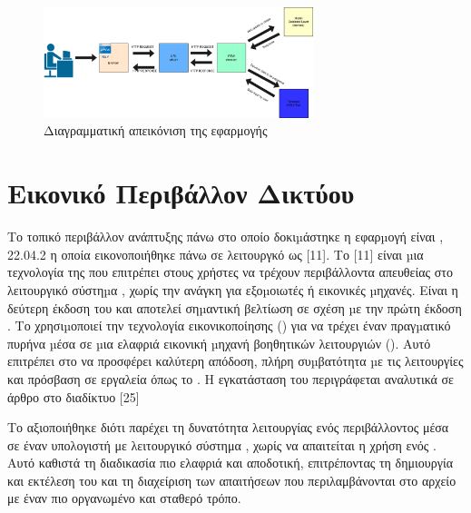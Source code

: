 \begin{figure}[h]
	\centering
	\includegraphics[width=0.7\textwidth]{graphics/MTV.drawio.png}
	\caption{Διαγραμματική απεικόνιση της εφαρμογής}
\end{figure}



\section{Εικονικό Περιβάλλον Δικτύου }


Το τοπικό περιβάλλον ανάπτυξης πάνω στο οποίο δοκιµάστηκε η εφαρµογή είναι ,  22.04.2  η οποία εικονοποιήθηκε πάνω σε λειτουργκό  ως [11]. Το [11] είναι µια τεχνολογία της  που επιτρέπει στους χρήστες  να τρέχουν  περιβάλλοντα απευθείας στο λειτουργικό σύστηµα , χωρίς την ανάγκη για εξοµοιωτές ή εικονικές µηχανές. Είναι η δεύτερη έκδοση του  και αποτελεί σηµαντική βελτίωση σε σχέση µε την πρώτη έκδοση . Το  χρησιµοποιεί την τεχνολογία εικονικοποίησης () για να τρέχει έναν πραγµατικό πυρήνα  µέσα σε µια ελαφριά εικονική µηχανή βοηθητικών λειτουργιών (). Αυτό επιτρέπει στο  να προσφέρει καλύτερη απόδοση, πλήρη συµβατότητα µε τις λειτουργίες  και πρόσβαση σε εργαλεία όπως το . Η εγκατάσταση του  περιγράφεται αναλυτικά σε άρθρο στο διαδίκτυο  [25]


Το  αξιοποιήθηκε διότι παρέχει τη δυνατότητα λειτουργίας ενός 
περιβάλλοντος  μέσα σε έναν υπολογιστή με λειτουργικό 
σύστημα , χωρίς να απαιτείται η χρήση ενός . 
Αυτό καθιστά τη διαδικασία πιο ελαφριά και αποδοτική, επιτρέποντας τη 
δημιουργία και εκτέλεση του  και τη διαχείριση των 
απαιτήσεων που περιλαμβάνονται στο αρχείο  με έναν πιο οργανωμένο και σταθερό τρόπο.

